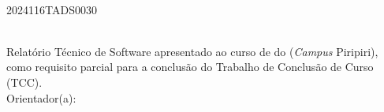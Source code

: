 \begin{titlepage}
\begin{center}
\textbf{\Autor} \\
2024116TADS0030 \\[3cm]

\textbf{\Titulo} \\[2cm]

\begin{flushright}
Relatório Técnico de Software apresentado ao curso de \Curso{} do \Instituicao{} (\textit{Campus} Piripiri), como requisito parcial para a conclusão do Trabalho de Conclusão de Curso (TCC). \\
Orientador(a): \Orientador
\end{flushright}

\vfill
\Cidade \\
\Ano
\end{center}
\end{titlepage}
